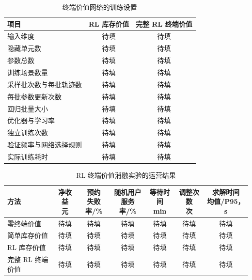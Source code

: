 \documentclass[12pt,a4paper,UTF8]{ctexart}
\numberwithin{equation}{section}
\begin{document}
\begin{table}[!htbp]
  \centering
  \caption{终端价值网络的训练设置}
  \label{exp:training}
  \small
  \begin{tabularx}{\linewidth}{@{}Xcc@{}}
    \toprule
    项目 & RL 库存价值 & 完整 RL 终端价值 \\
    \midrule
    输入维度 & 待填 & 待填 \\
    隐藏单元数 & 待填 & 待填 \\
    参数总数 & 待填 & 待填 \\
    训练场景数量 & 待填 & 待填 \\
    采样批次数与每批轨迹数 & 待填 & 待填 \\
    每批参数更新次数 & 待填 & 待填 \\
    回归批量大小 & 待填 & 待填 \\
    优化器与学习率 & 待填 & 待填 \\
    独立训练次数 & 待填 & 待填 \\
    验证频率与网络选择规则 & 待填 & 待填 \\
    实际训练耗时 & 待填 & 待填 \\
    \bottomrule
  \end{tabularx}
\end{table}

\begin{table}[!htbp]
  \centering
  \caption{RL 终端价值消融实验的运营结果}
  \label{exp:value_results}
  \small
  \setlength{\tabcolsep}{3pt}
  \begin{tabularx}{\linewidth}{@{}Xcccccc@{}}
    \toprule
    方法 & \shortstack{净收益\\元} & \shortstack{预约\\失败率/\%} & \shortstack{随机用户\\服务率/\%} & \shortstack{等待时间\\min} & \shortstack{调整次数\\次} & \shortstack{求解时间\\均值/P95，s} \\
    \midrule
    零终端价值 & 待填 & 待填 & 待填 & 待填 & 待填 & 待填 \\
    简单库存价值 & 待填 & 待填 & 待填 & 待填 & 待填 & 待填 \\
    RL 库存价值 & 待填 & 待填 & 待填 & 待填 & 待填 & 待填 \\
    完整 RL 终端价值 & 待填 & 待填 & 待填 & 待填 & 待填 & 待填 \\
    \bottomrule
  \end{tabularx}
\end{table}
\end{document}
